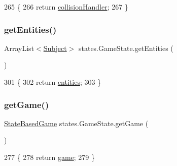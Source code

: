 \begin{DoxyCode}
265                                                   \{
266         \textcolor{keywordflow}{return} \mbox{\hyperlink{classstates_1_1_game_state_a7640e08453b2ce79066278d32d28ab63}{collisionHandler}};
267     \}
\end{DoxyCode}
\mbox{\label{classstates_1_1_game_state_ac441d850526544e548921068f5eb78d6}} 
\subsubsection{\texorpdfstring{get\+Entities()}{getEntities()}}
{\footnotesize\ttfamily Array\+List$<$\mbox{\hyperlink{classentities_1_1_subject}{Subject}}$>$ states.\+Game\+State.\+get\+Entities (\begin{DoxyParamCaption}{ }\end{DoxyParamCaption})\hspace{0.3cm}{\ttfamily [inline]}}


\begin{DoxyCode}
301                                             \{
302         \textcolor{keywordflow}{return} \mbox{\hyperlink{classstates_1_1_game_state_abb21bb28c6cdc15af651221a524d5073}{entities}};
303     \}
\end{DoxyCode}
\mbox{\label{classstates_1_1_game_state_a08a716dc1292aef4744b305312e598f1}} 
\subsubsection{\texorpdfstring{get\+Game()}{getGame()}}
{\footnotesize\ttfamily \mbox{\hyperlink{classorg_1_1newdawn_1_1slick_1_1state_1_1_state_based_game}{State\+Based\+Game}} states.\+Game\+State.\+get\+Game (\begin{DoxyParamCaption}{ }\end{DoxyParamCaption})\hspace{0.3cm}{\ttfamily [inline]}}


\begin{DoxyCode}
277                                     \{
278         \textcolor{keywordflow}{return} \mbox{\hyperlink{classstates_1_1_game_state_a5f563e34a3fc7d777396b68e00b321f5}{game}};
279     \}
\end{DoxyCode}
\mbox{\label{classstates_1_1_game_state_a7d95efb1651c71933e6c3228829cfb33}} 
